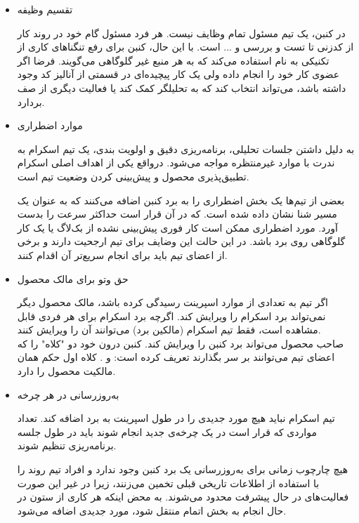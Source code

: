 {\begin{itemize}


\item تقسیم وظیفه

در کنبن، یک تیم مسئول تمام وظایف نیست. هر فرد مسئول گام خود در روند کار از کدزنی تا تست و بررسی و ... است. با این حال، کنبن برای رفع تنگنا‌های کاری از تکنیکی به نام  استفاده می‌کند که به هر منبع غیر گلوگاهی می‌گویند. فرضا اگر عضوی کار خود را انجام داده ولی یک کار پیچیده‌ای در قسمتی از آنالیز کد وجود داشته باشد، می‌تواند انتخاب کند که به تحلیلگر کمک کند یا فعالیت دیگری از صف بردارد.

\item موارد اضطراری

به دلیل داشتن جلسات تحلیلی، برنامه‌ریزی دقیق و اولویت بندی، یک تیم اسکرام به ندرت با موارد غیرمنتظره مواجه می‌شود. درواقع یکی از اهداف اصلی اسکرام تطبیق‌پذیری محصول و پیش‌بینی کردن وضعیت تیم است.

بعضی از تیم‌ها یک بخش اضطراری را به برد کنبن اضافه می‌کنند که به عنوان یک مسیر شنا نشان داده شده است. که در آن قرار است حداکثر سرعت را بدست آورد. مورد اضطراری ممکن است کار فوری پیش‌بینی نشده از بک‌لاگ یا یک کار گلوگاهی روی برد باشد. در این حالت این وضایف برای تیم ارجحیت دارند و برخی از اعضای تیم باید برای انجام سریع‌تر آن اقدام کنند.

\item حق وتو برای مالک محصول

اگر تیم به تعدادی از موارد اسپرینت رسیدگی کرده باشد، مالک محصول دیگر نمی‌تواند برد اسکرام را ویرایش کند. اگرچه برد اسکرام برای هر فردی قابل مشاهده است، فقط تیم اسکرام (مالکین برد) می‌توانند آن را ویرایش کنند.
\\
صاحب محصول می‌تواند برد کنبن را ویرایش کند. کنبن درون خود دو "کلاه" را که اعضای تیم می‌توانند بر سر بگذارند تعریف کرده است:  و . کلاه اول حکم همان مالکیت محصول را دارد.


\item به‌روزرسانی در هر چرخه

تیم اسکرام نباید هیچ مورد جدیدی را در طول اسپرینت به برد اضافه کند. تعداد مواردی که قرار است در یک چرخه‌ی جدید انجام شوند باید در طول جلسه برنامه‌ریزی تنظیم شوند.

هیچ چارچوب زمانی برای به‌روزرسانی یک برد کنبن وجود ندارد و افراد تیم روند را با استفاده از اطلاعات تاریخی قبلی تخمین می‌زنند، زیرا در غیر این صورت فعالیت‌های در حال پیشرفت محدود می‌شوند. به محض اینکه هر کاری از ستون در حال انجام به بخش اتمام منتقل شود، مورد جدیدی اضافه می‌شود.



\end{itemize}}
